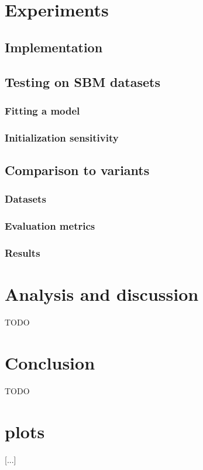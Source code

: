 \documentclass[11pt]{article}
\begin{document}
\section{Experiments}
\label{sec:experiments}

\subsection{Implementation}


\subsection{Testing on SBM datasets}

\subsubsection{Fitting a model}

\subsubsection{Initialization sensitivity}


\subsection{Comparison to variants}

\subsubsection{Datasets}

\subsubsection{Evaluation metrics}

\subsubsection{Results}


\section{Analysis and discussion}
\label{sec:discussion}

TODO



\section{Conclusion}
\label{sec:conclusion}

TODO




\newpage

\appendix
\section{plots}

 [...]



\end{document}
